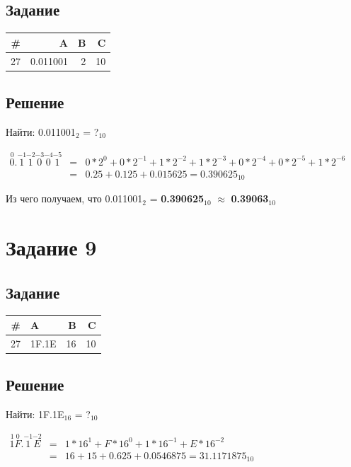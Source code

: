 \documentclass[11pt]{article}
\begin{document}
\subsection{Задание}
\label{sec:org061e41e}
\begin{center}
\begin{tabular}{|r|rrr|}
\hline
\# & A & B & C\\
\hline
27 & 0.011001 & 2 & 10\\
\hline
\end{tabular}
\end{center}

\subsection{Решение}
\label{sec:org9d5bbaa}
Найти: 0.011001\(_{\text{2}}\) = ?\(_{\text{10}}\)
\begin{center}
\(\begin{array}{lcl}
\overset{0}{0}.\overset{-1}{1}\overset{-2}{1}\overset{-3}{0}\overset{-4}{0}\overset{-5}{1}
& = & 0 * 2^0 + 0 * 2^{-1} + 1 * 2^{-2} + 1 * 2^{-3} + 0 * 2^{-4} + 0 * 2^{-5} + 1 * 2^{-6} \\
& = & 0.25 + 0.125 + 0.015625 = 0.390625_{10}
\end{array}\)
\end{center}

Из чего получаем, что 0.011001\(_{\text{2}}\) = \textbf{0.390625\(_{\text{10}}\)} \(\approx\) \textbf{0.39063\(_{\text{10}}\)}

\section{Задание 9}
\label{sec:orgab9ac1e}
\subsection{Задание}
\label{sec:org1ea47e2}
\begin{center}
\begin{tabular}{|r|lrr|}
\hline
\# & A & B & C\\
\hline
27 & 1F.1E & 16 & 10\\
\hline
\end{tabular}
\end{center}

\subsection{Решение}
\label{sec:org9653f28}
Найти: 1F.1E\(_{\text{16}}\) = ?\(_{\text{10}}\)
\begin{center}
\(\begin{array}{lcl}
\overset{1}{1}\overset{0}{F}.\overset{-1}{1}\overset{-2}{E}
& = & 1 * 16^1 + F * 16^0 + 1 * 16^{-1} + E * 16^{-2} \\
& = & 16 + 15 + 0.625 + 0.0546875 = 31.1171875_{10}
\end{array}\)
\end{center}
\end{document}
